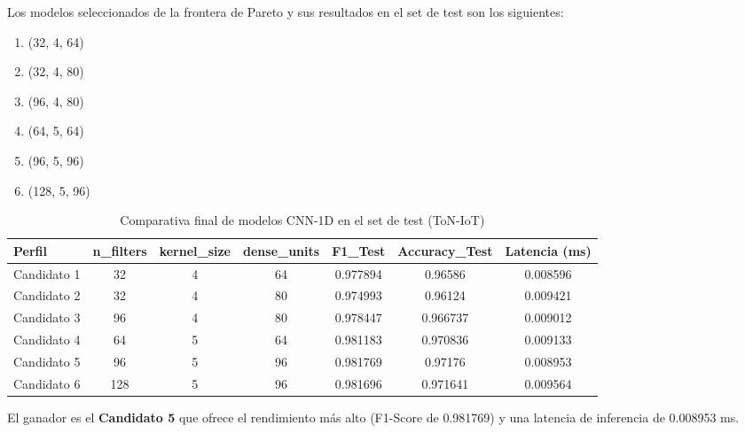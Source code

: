 Los modelos seleccionados de la frontera de Pareto y sus resultados en el set de test son los siguientes:

\begin{enumerate}
    \item (32, 4, 64) 
    \item (32, 4, 80) 
    \item (96, 4, 80) 
    \item (64, 5, 64) 
    \item (96, 5, 96) 
    \item (128, 5, 96) 
\end{enumerate}

\begin{table}[H]
    \centering
    \begin{tabular}{|l|c|c|c|c|c|c|}
        \hline
        \textbf{Perfil} & \textbf{n\_filters} & \textbf{kernel\_size} & \textbf{dense\_units} & \textbf{F1\_Test} & \textbf{Accuracy\_Test} & \textbf{Latencia (ms)} \\
        \hline
        Candidato 1 & 32 & 4 & 64 & 0.977894 & 0.96586 & 0.008596 \\
        \hline
        Candidato 2 & 32 & 4 & 80 & 0.974993 & 0.96124 & 0.009421 \\
        \hline
        Candidato 3 & 96 & 4 & 80 & 0.978447 & 0.966737 & 0.009012 \\
        \hline
        Candidato 4 & 64 & 5 & 64 & 0.981183 & 0.970836 & 0.009133 \\
        \hline
        Candidato 5 & 96 & 5 & 96 & 0.981769 & 0.97176 & 0.008953 \\
        \hline
        Candidato 6 & 128 & 5 & 96 & 0.981696 & 0.971641 & 0.009564 \\
        \hline
    \end{tabular}
    \caption{Comparativa final de modelos CNN-1D en el set de test (ToN-IoT)}
    \label{tab:cnn_comparison_ton}
\end{table}

El ganador es el \textbf{Candidato 5} que ofrece el rendimiento más alto (F1-Score de 0.981769) y una latencia de inferencia de 0.008953 ms.
